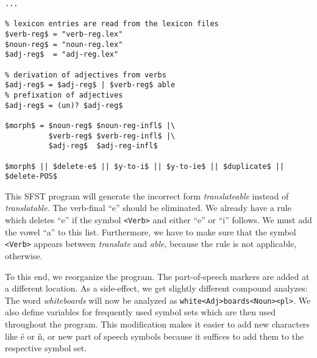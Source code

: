 \documentclass[11pt]{article}
\begin{document}
\begin{verbatim}
...

% lexicon entries are read from the lexicon files
$verb-reg$ = "verb-reg.lex"
$noun-reg$ = "noun-reg.lex"
$adj-reg$  = "adj-reg.lex"

% derivation of adjectives from verbs
$adj-reg$ = $adj-reg$ | $verb-reg$ able
% prefixation of adjectives
$adj-reg$ = (un)? $adj-reg$

$morph$ = $noun-reg$ $noun-reg-infl$ |\
          $verb-reg$ $verb-reg-infl$ |\
          $adj-reg$  $adj-reg-infl$

$morph$ || $delete-e$ || $y-to-i$ || $y-to-ie$ || $duplicate$ || $delete-POS$
\end{verbatim}

This SFST program will generate the incorrect form
\emph{translateable} instead of \emph{translatable}. The verb-final
``e'' should be eliminated. We already have a rule which deletes ``e''
if the symbol \verb#<Verb># and either ``e'' or ``i'' follows. We must
add the vowel ``a'' to this list. Furthermore, we have to make sure
that the symbol \verb#<Verb># appears between \emph{translate} and
\emph{able}, because the rule is not applicable, otherwise.

To this end, we reorganize the program. The part-of-speech markers are
added at a different location. As a side-effect, we get slightly
different compound analyzes: The word \emph{whiteboards} will now be
analyzed as \verb#white<Adj>boards<Noun><pl>#. We also define variables
for frequently used symbol sets which are then used throughout the
program. This modification makes it easier to add new characters like
{\'e} or {\~n}, or new part of speech symbols because it suffices
to add them to the respective symbol set.
\end{document}
